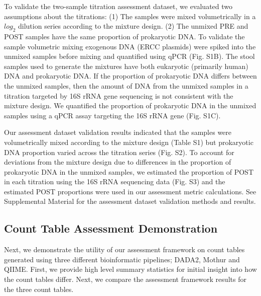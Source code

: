 \documentclass[linenumbers]{bmcart}
\begin{document}
To validate the two-sample titration assessment dataset,
we evaluated two assumptions about the titrations:
(1) The samples were mixed volumetrically in a
\(log_2\) dilution series according to the mixture design.
(2) The unmixed PRE and POST samples
have the same proportion of prokaryotic DNA.
To validate the sample volumetric mixing exogenous DNA (ERCC plasmids) were spiked into the
unmixed samples before mixing and quantified
using qPCR (Fig. S1B). The stool samples used to generate the mixtures have both eukaryotic (primarily human) DNA and
prokaryotic DNA. If the proportion of prokaryotic DNA differs between
the unmixed samples, then the amount of DNA from the unmixed samples in
a titration targeted by 16S rRNA gene sequencing is not consistent with
the mixture design. We quantified the proportion of prokaryotic DNA in the unmixed samples using a qPCR assay targeting the 16S rRNA gene (Fig. S1C).

Our assessment dataset validation results indicated that the samples were volumetrically mixed according to the mixture design (Table S1) but prokaryotic DNA proportion varied across the titration series (Fig. S2). 
To account for deviations from the mixture design due to differences in the proportion of prokaryotic DNA in the unmixed samples, we estimated the proportion of POST in each titration using the 16S rRNA sequencing data (Fig. S3) and 
the estimated POST proportions were used in our assessment metric calculations. 
See Supplemental Material for the assessment dataset validation methods and results.


\subsection*{Count Table Assessment Demonstration}
Next, we demonstrate the utility of our assessment framework on count tables generated using three different bioinformatic pipelines; DADA2, Mothur and QIIME.
First, we provide high level summary statistics for initial insight into how the count tables differ.
Next, we compare the assessment framework results for the three count tables.
\end{document}
